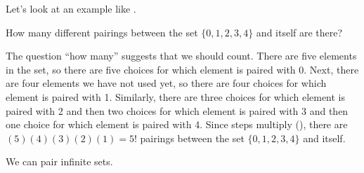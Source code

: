 Let's look at an example like .

\begin{exam}
\label{exam_count_pairings_self} 
    How many different pairings between the set $\{0,1,2,3,4\}$ and itself are there?
        \begin{soln}
            The question ``how many'' suggests that we should count.  There are five elements in the set, so there are five choices for which element is paired with 0.  Next, there are four elements we have not used yet, so there are four choices for which element is paired with 1.  Similarly, there are three choices for which element is paired with 2 and then two choices for which element is paired with 3 and then one choice for which element is paired with 4.  Since steps multiply (), there are $(5)(4)(3)(2)(1) = 5!$ pairings between the set $\{0,1,2,3,4\}$ and itself.
        \end{soln}
\end{exam}

We can pair infinite sets.

